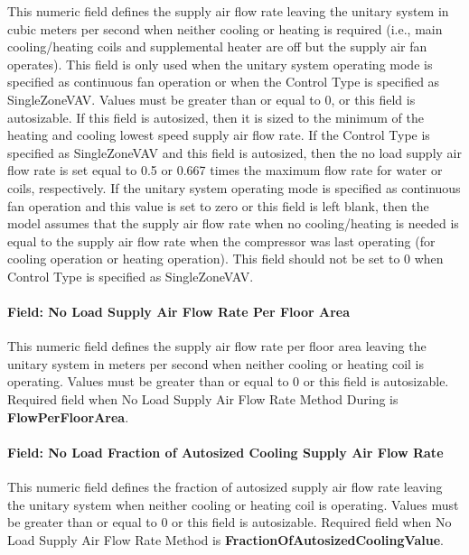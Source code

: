 This numeric field defines the supply air flow rate leaving the unitary system in cubic meters per second when neither cooling or heating is required (i.e., main cooling/heating coils and supplemental heater are off but the supply air fan operates). This field is only used when the unitary system operating mode is specified as continuous fan operation or when the Control Type is specified as SingleZoneVAV. Values must be greater than or equal to 0, or this field is autosizable. If this field is autosized, then it is sized to the minimum of the heating and cooling lowest speed supply air flow rate. If the Control Type is specified as SingleZoneVAV and this field is autosized, then the no load supply air flow rate is set equal to 0.5 or 0.667 times the maximum flow rate for water or coils, respectively. If the unitary system operating mode is specified as continuous fan operation and this value is set to zero or this field is left blank, then the model assumes that the supply air flow rate when no cooling/heating is needed is equal to the supply air flow rate when the compressor was last operating (for cooling operation or heating operation). This field should not be set to 0 when Control Type is specified as SingleZoneVAV.

\paragraph{Field: No Load Supply Air Flow Rate Per Floor Area}\label{field-no-load-supply-air-flow-rate-per-floor-area}

This numeric field defines the supply air flow rate per floor area leaving the unitary system in meters per second when neither cooling or heating coil is operating. Values must be greater than or equal to 0 or this field is autosizable. Required field when No Load Supply Air Flow Rate Method During is \textbf{FlowPerFloorArea}.

\paragraph{Field: No Load Fraction of Autosized Cooling Supply Air Flow Rate}\label{field-no-load-fraction-of-autosized-cooling-supply-air-flow-rate}

This numeric field defines the fraction of autosized supply air flow rate leaving the unitary system when neither cooling or heating coil is operating. Values must be greater than or equal to 0 or this field is autosizable. Required field when No Load Supply Air Flow Rate Method is \textbf{FractionOfAutosizedCoolingValue}.

